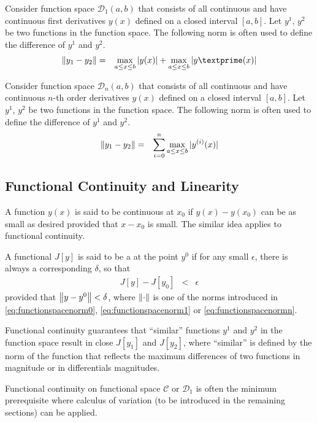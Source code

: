 Consider function space $\mathcal{D}_1(a,b)$ that consists of all continuous and have continuous first derivatives $y(x)$ defined on a closed interval $[a,b]$. Let $y^1$, $y^2$ be two functions in the function space. The following norm is often used to define the difference of $y^1$ and $y^2$.
\begin{eqnarray}
  \norm{y_1 - y_2} &=& \max_{a\leq x \leq b} |y(x)| + \max_{a\leq x \leq b} |y\textprime(x)| \label{eq:functionspacenorm1}
\end{eqnarray} 

Consider function space $\mathcal{D}_n(a,b)$ that consists of all continuous and have continuous $n$-th order derivatives $y(x)$ defined on a closed interval $[a,b]$. Let $y^1$, $y^2$ be two functions in the function space. The following norm is often used to define the difference of $y^1$ and $y^2$.
\begin{eqnarray}
  \left\lVert y_1 - y_2\right\rVert &=& \sum_{i=0}^{n} \max_{a\leq x \leq b} |y^{(i)}(x)| \label{eq:functionspacenormn}
\end{eqnarray} 

\subsection{Functional Continuity and Linearity} \label{sec:functionalcontinuity}

A function $y(x)$ is said to be continuous at $x_0$ if $y(x) - y(x_0)$ can be as small as desired provided that $x-x_0$ is small. The similar idea applies to functional continuity. 

A functional $J[y]$ is said to be a  at the point $y^0$ if for any small $\epsilon$, there is always a corresponding $\delta$, so that
\begin{eqnarray}
  J[y] - J[y_0] &<& \epsilon \nonumber
\end{eqnarray}
provided that $\left\lVert y-y^0\right\rVert < \delta$, where $\left\lVert\cdot\right\rVert$ is one of the norms introduced in \eqref{eq:functionspacenorm0}, \eqref{eq:functionspacenorm1} or \eqref{eq:functionspacenormn}. 

Functional continuity guarantees that ``similar'' functions $y^1$ and $y^2$ in the function space result in close $J[y_1]$ and $J[y_2]$, where ``similar'' is defined by the norm of the function that reflects the maximum differences of two functions in magnitude or in differentials magnitudes.

Functional continuity on functional space $\mathcal{C}$ or $\mathcal{D}_1$ is often the minimum prerequisite where calculus of variation (to be introduced in the remaining sections) can be applied.
 
